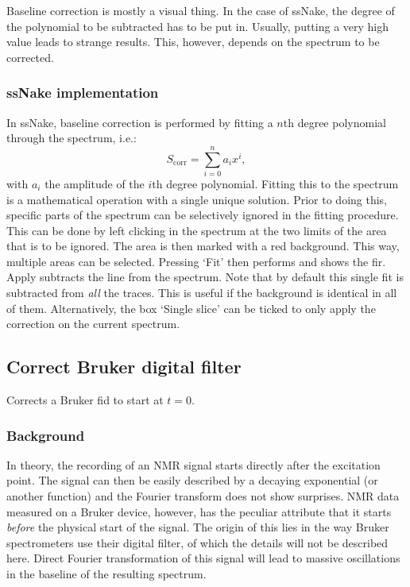 \documentclass[11pt,a4paper]{article}
\begin{document}
Baseline correction is mostly a visual thing. In the case of ssNake, the degree of the polynomial to be subtracted has to be put in. Usually, putting a very high value leads to strange results. This, however, depends on the spectrum to be corrected.

\subsubsection*{ssNake implementation}
In ssNake, baseline correction is performed by fitting a $n$th degree polynomial through the spectrum, i.e.:
\begin{equation*}
S_\text{corr} = \sum_{i=0}^n a_i x^i ,
\end{equation*}
with $a_i$ the amplitude of the $i$th degree polynomial. Fitting this to the spectrum is a mathematical operation with a single unique solution. Prior to doing this, specific parts of the spectrum can be selectively ignored in the fitting procedure. This can be done by left clicking in the spectrum at the two limits of the area that is to be ignored. The area is then marked with a red background. This way, multiple areas can be selected. Pressing  `Fit' then performs and shows the fir. Apply subtracts the line from the spectrum. Note that by default this single fit is subtracted from \textit{all} the traces. This is useful if the background is identical in all of them. Alternatively, the box `Single slice' can be ticked to only apply the correction on the current spectrum.



\subsection{Correct Bruker digital filter}
Corrects a Bruker fid to start at $t=0$.

\subsubsection*{Background}
In theory, the recording of an NMR signal starts directly after the excitation point. The signal can then be easily described by a decaying exponential (or another function) and the Fourier transform does not show surprises. NMR data measured on a Bruker device, however, has the peculiar attribute that it starts \textit{before} the physical start of the signal. The origin of this lies in the way Bruker spectrometers use their digital filter, of which the details will not be described here. Direct Fourier transformation of this signal will lead to massive oscillations in the baseline of the resulting spectrum.
\end{document}

